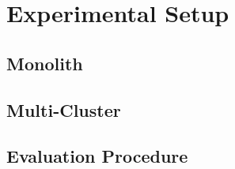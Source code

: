\section{Experimental Setup}

\subsection{Monolith}

\subsection{Multi-Cluster}


\subsection{Evaluation Procedure}
